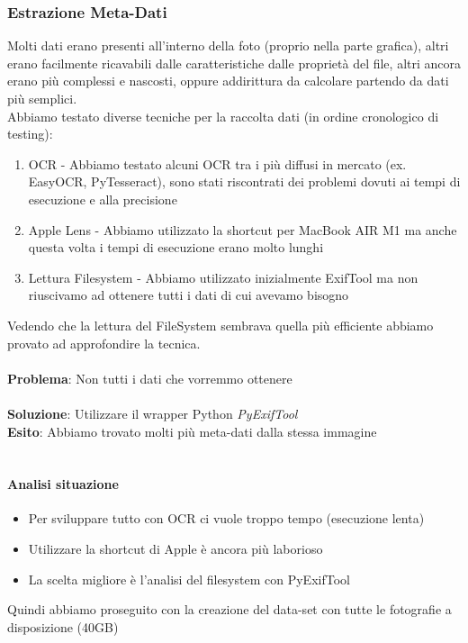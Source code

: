 \documentclass[12pt,a4paper,twoside]{article}
\begin{document}
\subsubsection{Estrazione Meta-Dati}
Molti dati erano presenti all'interno della foto (proprio nella parte grafica), altri erano facilmente ricavabili 
dalle caratteristiche dalle proprietà del file, altri ancora erano più complessi e nascosti, oppure addirittura 
da calcolare partendo da dati più semplici.\\
Abbiamo testato diverse tecniche per la raccolta dati (in ordine cronologico di testing):
\begin{enumerate}
    \item OCR - Abbiamo testato alcuni OCR tra i più diffusi in mercato (ex. EasyOCR, PyTesseract), sono stati 
          riscontrati dei problemi dovuti ai tempi di esecuzione e alla precisione
    \item Apple Lens - Abbiamo utilizzato la shortcut per MacBook AIR M1 ma anche questa volta i tempi di 
          esecuzione erano molto lunghi
    \item Lettura Filesystem - Abbiamo utilizzato inizialmente ExifTool ma non riuscivamo ad ottenere tutti i 
          dati di cui avevamo bisogno
\end{enumerate}
Vedendo che la lettura del FileSystem sembrava quella più efficiente abbiamo provato ad approfondire la tecnica.
\\\\
\textbf{Problema}: Non tutti i dati che vorremmo ottenere\\
\\
\textbf{Soluzione}: Utilizzare il wrapper Python \textit{PyExifTool}\\
\textbf{Esito}: Abbiamo trovato molti più meta-dati dalla stessa immagine\\
\\

\paragraph{Analisi situazione}
\begin{itemize}
    \item Per sviluppare tutto con OCR ci vuole troppo tempo (esecuzione lenta)
    \item Utilizzare la shortcut di Apple è ancora più laborioso
    \item La scelta migliore è l'analisi del filesystem con PyExifTool
\end{itemize}
Quindi abbiamo proseguito con la creazione del data-set con tutte le fotografie a disposizione (40GB)
\end{document}
